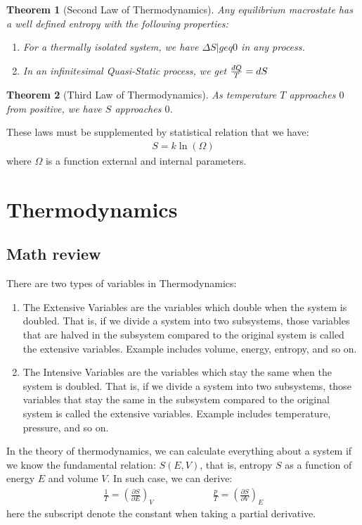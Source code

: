 \documentclass[11pt]{article}
\theoremstyle{break}
\theoremstyle{break}
\newtheorem{thm}{Theorem}[section]
\newcommand{\dbar}{d\hspace*{-0.08em}\bar{}\hspace*{0.1em}}
\begin{document}
\begin{thm}[Second Law of Thermodynamics]
Any equilibrium macrostate has a well defined entropy with the following properties:
\begin{enumerate}
\item For a thermally isolated system, we have $\Delta S |geq 0$ in any process.
\item In an infinitesimal Quasi-Static process, we get $\frac{\dbar Q}{T} = dS$
\end{enumerate}
\end{thm}

\begin{thm}[Third Law of Thermodynamics]
As temperature $T$ approaches $0$ from positive, we have $S$ approaches $0$. 
\end{thm}

These laws must be supplemented by statistical relation that we have:
\begin{align*}
S = k\ln(\Omega)
\end{align*}
where $\Omega$ is a function external and internal parameters. 

\newpage
\section{\color{red} Thermodynamics}
\subsection*{Math review}
There are two types of variables in Thermodynamics: 
\begin{enumerate}
\item The Extensive Variables are the variables which double when the system is doubled. That is, if we divide a system into two subsystems, those variables that are halved in the subsystem compared to the original system is called the extensive variables. Example includes volume, energy, entropy, and so on.
\item The Intensive Variables are the variables which stay the same when the system is doubled.  That is, if we divide a system into two subsystems, those variables that stay the same in the subsystem compared to the original system is called the extensive variables. Example includes temperature, pressure, and so on.
\end{enumerate}

In the theory of thermodynamics, we can calculate everything about a system if we know the fundamental relation: $S(E,V)$, that is, entropy $S$ as a function of energy $E$ and volume $V$. In such case, we can derive:
\begin{align*}
\frac{1}{T} = \left( \frac{\partial S}{\partial E}\right)_V \qquad\qquad\qquad \frac{p}{T} = \left( \frac{\partial S}{\partial V}\right)_E
\end{align*}
here the subscript denote the constant when taking a partial derivative. \\
\end{document}

